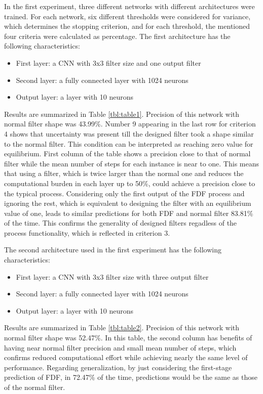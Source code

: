 \documentclass[journal]{IEEEtran}
\begin{document}
In the first experiment, three different networks with different architectures were trained. For each network, six different thresholds were considered for variance, which determines the stopping criterion, and for each threshold, the mentioned four criteria were calculated as percentage. The first architecture has the following characteristics:
\begin{itemize}
\item First layer: a CNN with 3x3 filter size and one output filter
\item Second layer: a fully connected layer with 1024 neurons
\item Output layer: a layer with 10 neurons
\end{itemize}
Results are summarized in Table \ref{tbl:table1}. Precision of this network with normal filter shape was 43.99\%. Number 9 appearing in the last row for criterion 4 shows that uncertainty was present till the designed filter took a shape similar to the normal filter. This condition can be interpreted as reaching zero value for equilibrium. First column of the table shows a precision close to that of normal filter while the mean number of steps for each instance is near to one. This means that using a filter, which is twice larger than the normal one and reduces the computational burden in each layer up to 50\%, could achieve a precision close to the typical process. Considering only the first output of the FDF process and ignoring the rest, which is equivalent to designing the filter with an equilibrium value of one, leads to similar predictions for both FDF and normal filter 83.81\% of the time.  This confirms the generality of designed filters regadless of the process functionality, which is reflected in criterion 3.

The second architecture used in the first experiment has the following characteristics:
\begin{itemize}
\item First layer: a CNN with 3x3 filter size with three output filter
\item Second layer: a fully connected layer with 1024 neurons
\item Output layer: a layer with 10 neurons
\end{itemize}
Results are summarized in Table \ref{tbl:table2}. Precision of this network with normal filter shape was 52.47\%. In this table, the second column has benefits of having near normal filter precision and small mean number of steps, which confirms reduced computational effort while achieving nearly the same level of performance. Regarding generalization, by just considering the first-stage prediction of FDF, in 72.47\% of the time, predictions would be the same as those of the normal filter.
\end{document}
